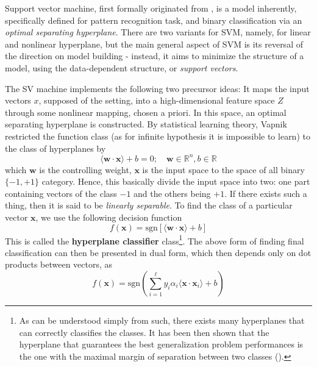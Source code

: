 Support vector machine, first formally originated from \cite{Vapnik1999-VAPTNO}, is a model inherently, specifically defined for pattern recognition task, and binary classification via an \textit{optimal separating hyperplane}. There are two variants for SVM, namely, for linear and nonlinear hyperplane, but the main general aspect of SVM is its reversal of the direction on model building - instead, it aims to minimize the structure of a model, using the data-dependent structure, or \textit{support vectors}. 

The SV machine implements the following two precursor ideas: It maps the input vectors $x$, supposed of the setting, into a high-dimensional feature space $Z$ through some nonlinear mapping, chosen a priori. In this space, an optimal separating hyperplane is constructed. By statistical learning theory, Vapnik restricted the function class (as for infinite hypothesis it is impossible to learn) to the class of hyperplanes by 
\begin{equation}
    \langle \mathbf{w}\cdot \mathbf{x} \rangle + b = 0 ; \quad \mathbf{w}\in \mathbb{R}^{n} , b\in \mathbb{R}
\end{equation}
which $\mathbf{w}$ is the controlling weight, $\mathbf{x}$ is the input space to the space of all binary $\{-1,+1\}$ category. Hence, this basically divide the input space into two: one part containing vectors of the class $-1$ and the others being $+1$. If there exists such a thing, then it is said to be \textit{linearly separable}. To find the class of a particular vector $\mathbf{x}$, we use the following decision function 
\begin{equation}
    f(\mathbf{x}) = \mathrm{sgn}[\langle \mathbf{w}\cdot \mathbf{x}\rangle+ b]
\end{equation}
This is called the \textbf{hyperplane classifier} class\footnote{As can be understood simply from such, there exists many hyperplanes that can correctly classifies the classes. It has been then shown that the hyperplane that guarantees the best generalization problem performances is the one with the maximal margin of separation between two classes (\cite{Cristianini2000AnIT}).}. The above form of finding final classification can then be presented in dual form, which then depends only on dot products between vectors, as 
\begin{equation}
    f(\mathbf{x}) = \mathrm{sgn}\left(\sum^{\ell}_{i=1} y_{i}\alpha_{i} \langle \mathbf{x}\cdot \mathbf{x}_{i} \rangle+ b\right)
\end{equation} 

